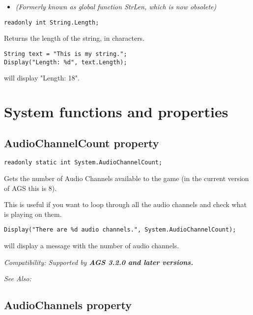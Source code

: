 \begin{itemize}
\item \it{(Formerly known as global function StrLen, which is now obsolete)}
\end{itemize}

\begin{verbatim}
readonly int String.Length;
\end{verbatim}
Returns the length of the string, in characters.

\begin{verbatim}
String text = "This is my string.";
Display("Length: %d", text.Length);
\end{verbatim}
will display "Length: 18".



\section{System functions and properties}%


\subsection{AudioChannelCount property}\label{System.AudioChannelCount}%

\begin{verbatim}
readonly static int System.AudioChannelCount;
\end{verbatim}
Gets the number of Audio Channels available to the game (in the current version of AGS this is 8).

This is useful if you want to loop through all the audio channels and check what is playing on them.

\begin{verbatim}
Display("There are %d audio channels.", System.AudioChannelCount);
\end{verbatim}
will display a message with the number of audio channels.

\it{Compatibility:} Supported by \bf{AGS 3.2.0} and later versions.

\it{See Also:} 


\subsection{AudioChannels property}\label{System.AudioChannels}%


